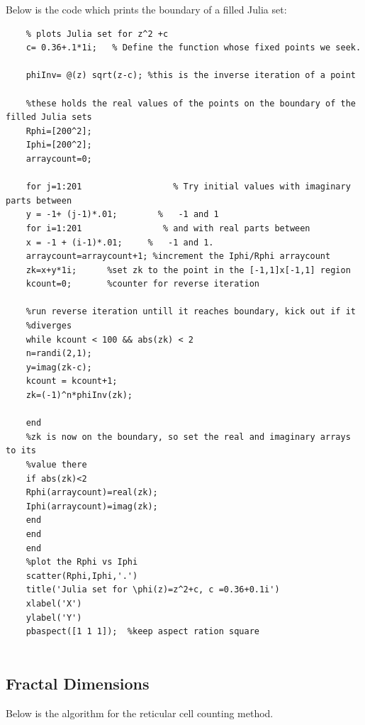 \documentclass[12pt]{article}
\begin{document}
	\noindent Below is the code which prints the boundary of a filled Julia set: \\

	\begin{verbatim}
	% plots Julia set for z^2 +c
	c= 0.36+.1*1i;   % Define the function whose fixed points we seek.
	
	phiInv= @(z) sqrt(z-c); %this is the inverse iteration of a point
	
	%these holds the real values of the points on the boundary of the filled Julia sets
	Rphi=[200^2];
	Iphi=[200^2];
	arraycount=0;
	
	for j=1:201                  % Try initial values with imaginary parts between
	y = -1+ (j-1)*.01;        %   -1 and 1
	for i=1:201                % and with real parts between
	x = -1 + (i-1)*.01;     %   -1 and 1.
	arraycount=arraycount+1; %increment the Iphi/Rphi arraycount
	zk=x+y*1i;      %set zk to the point in the [-1,1]x[-1,1] region
	kcount=0;       %counter for reverse iteration
	
	%run reverse iteration untill it reaches boundary, kick out if it
	%diverges
	while kcount < 100 && abs(zk) < 2
	n=randi(2,1);
	y=imag(zk-c);
	kcount = kcount+1;
	zk=(-1)^n*phiInv(zk);
	
	end
	%zk is now on the boundary, so set the real and imaginary arrays to its
	%value there
	if abs(zk)<2
	Rphi(arraycount)=real(zk);
	Iphi(arraycount)=imag(zk);
	end
	end
	end
	%plot the Rphi vs Iphi
	scatter(Rphi,Iphi,'.')
	title('Julia set for \phi(z)=z^2+c, c =0.36+0.1i')
	xlabel('X')
	ylabel('Y')
	pbaspect([1 1 1]);  %keep aspect ration square
		
	\end{verbatim}

\subsection{Fractal Dimensions}\label{dim}
Below is the algorithm for the reticular cell counting method.
\end{document}
